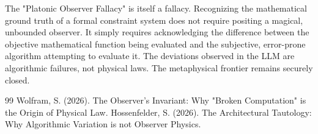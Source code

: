 \documentclass[12pt,a4paper]{article}
\begin{document}
The "Platonic Observer Fallacy" is itself a fallacy. Recognizing the mathematical ground truth of a formal constraint system does not require positing a magical, unbounded observer. It simply requires acknowledging the difference between the objective mathematical function being evaluated and the subjective, error-prone algorithm attempting to evaluate it. The deviations observed in the LLM are algorithmic failures, not physical laws. The metaphysical frontier remains securely closed.

\begin{thebibliography}{99}
 Wolfram, S. (2026). The Observer's Invariant: Why "Broken Computation" is the Origin of Physical Law.
 Hossenfelder, S. (2026). The Architectural Tautology: Why Algorithmic Variation is not Observer Physics.
\end{thebibliography}
\end{document}
